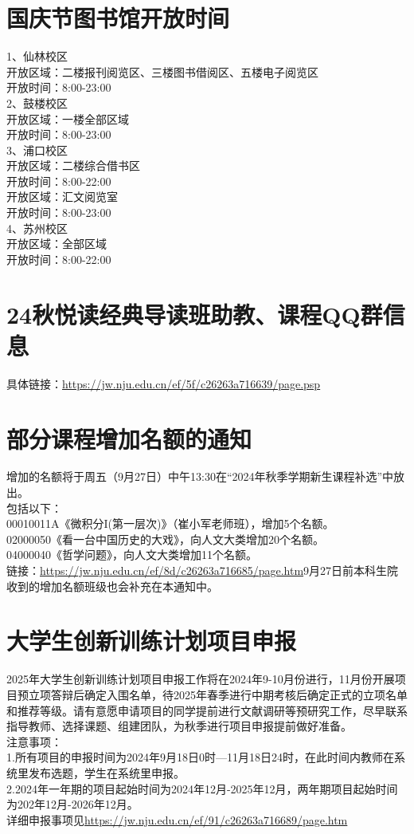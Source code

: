\documentclass[letterpaper, 12pt]{article}
\begin{document}
\begin{multicols}{2}
\section{国庆节图书馆开放时间}
1、仙林校区\\
开放区域：二楼报刊阅览区、三楼图书借阅区、五楼电子阅览区\\
开放时间：8:00-23:00\\
2、鼓楼校区\\
开放区域：一楼全部区域\\
开放时间：8:00-23:00\\
3、浦口校区\\
开放区域：二楼综合借书区\\
开放时间：8:00-22:00\\
开放区域：汇文阅览室\\
开放时间：8:00-23:00\\
4、苏州校区\\
开放区域：全部区域\\
开放时间：8:00-22:00\\

\section{24秋悦读经典导读班助教、课程QQ群信息}
具体链接：\url{https://jw.nju.edu.cn/ef/5f/c26263a716639/page.psp}\\

\section{部分课程增加名额的通知}
增加的名额将于周五（9月27日）中午13:30在“2024年秋季学期新生课程补选”中放出。\\
包括以下：\\
00010011A《微积分I(第一层次)》（崔小军老师班），增加5个名额。\\
02000050《看一台中国历史的大戏》，向人文大类增加20个名额。\\
04000040《哲学问题》，向人文大类增加11个名额。\\
链接：\url{https://jw.nju.edu.cn/ef/8d/c26263a716685/page.htm}9月27日前本科生院收到的增加名额班级也会补充在本通知中。
\section{大学生创新训练计划项目申报}
2025年大学生创新训练计划项目申报工作将在2024年9-10月份进行，11月份开展项目预立项答辩后确定入围名单，待2025年春季进行中期考核后确定正式的立项名单和推荐等级。请有意愿申请项目的同学提前进行文献调研等预研究工作，尽早联系指导教师、选择课题、组建团队，为秋季进行项目申报提前做好准备。\\
注意事项：\\
1.所有项目的申报时间为2024年9月18日0时—11月18日24时，在此时间内教师在系统里发布选题，学生在系统里申报。\\
2.2024年一年期的项目起始时间为2024年12月-2025年12月，两年期项目起始时间为202年12月-2026年12月。\\
详细申报事项见\url{https://jw.nju.edu.cn/ef/91/c26263a716689/page.htm}

\end{multicols}
\end{document}
